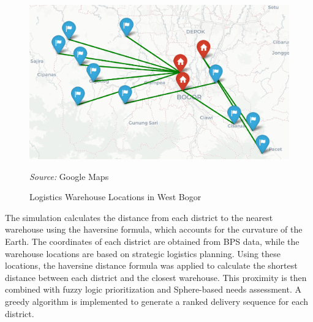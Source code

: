 \documentclass[journal,final,a4paper,twoside,11pt]{IEEEtran}
\begin{document}
\begin{figure}[H]
    \centerline{\includegraphics[width=0.9\linewidth]{fig8.png}}
    \caption{Logistics Warehouse Locations in West Bogor}
    \label{fig:warehouse_location}
    \footnotesize{\textit{Source:} Google Maps}
\end{figure}

The simulation calculates the distance from each district to the nearest warehouse using the haversine formula, which accounts for the curvature of the Earth. The coordinates of each district are obtained from BPS data, while the warehouse locations are based on strategic logistics planning.
Using these locations, the haversine distance formula was applied to calculate the shortest distance between each district and the closest warehouse. This proximity is then combined with fuzzy logic prioritization and Sphere-based needs assessment. A greedy algorithm is implemented to generate a ranked delivery sequence for each district.
\end{document}
